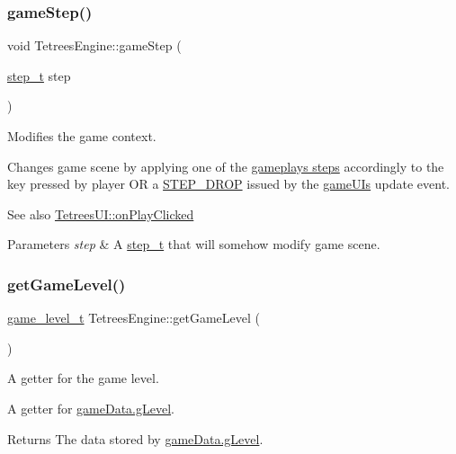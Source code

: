 \subsubsection{\texorpdfstring{game\+Step()}{gameStep()}}
{\footnotesize\ttfamily void Tetrees\+Engine\+::game\+Step (\begin{DoxyParamCaption}\item[{\hyperlink{TetreesDefs_8hpp_a4d5a793092a473f85b4c1f7faf62afed}{step\+\_\+t}}]{step }\end{DoxyParamCaption})}



Modifies the game context. 

Changes game scene by applying one of the \hyperlink{TetreesDefs_8hpp_a4d5a793092a473f85b4c1f7faf62afed}{gameplay\textquotesingle{}s steps} accordingly to the key pressed by player OR a \hyperlink{TetreesDefs_8hpp_a4d5a793092a473f85b4c1f7faf62afed}{S\+T\+E\+P\+\_\+\+D\+R\+OP} issued by the \hyperlink{classTetreesEngine_a01bf1d438236d5f57129ffb22adf59ce}{game\+UI\textquotesingle{}s} update event. \begin{DoxySeeAlso}{See also}
\hyperlink{classTetreesUI_a0aa1932ac8f09f6d8de7ac7d7a2efa94}{Tetrees\+U\+I\+::on\+Play\+Clicked} 
\end{DoxySeeAlso}

\begin{DoxyParams}{Parameters}
{\em step} & A \hyperlink{TetreesDefs_8hpp_a4d5a793092a473f85b4c1f7faf62afed}{step\+\_\+t} that will somehow modify game scene. \\
\hline
\end{DoxyParams}
\mbox{\label{classTetreesEngine_a7ad503b48ba753c446e5438ca67aa4e3}} 
\subsubsection{\texorpdfstring{get\+Game\+Level()}{getGameLevel()}}
{\footnotesize\ttfamily \hyperlink{structgame__level__t}{game\+\_\+level\+\_\+t} Tetrees\+Engine\+::get\+Game\+Level (\begin{DoxyParamCaption}{ }\end{DoxyParamCaption})}



A getter for the game level. 

A getter for \hyperlink{TetreesDefs_8hpp_aebae08b2e3a36f1452b33acaf1eaab40}{game\+Data.g\+Level}. \begin{DoxyReturn}{Returns}
The data stored by \hyperlink{TetreesDefs_8hpp_aebae08b2e3a36f1452b33acaf1eaab40}{game\+Data.g\+Level}. 
\end{DoxyReturn}
\mbox{\label{classTetreesEngine_a46108b9a7ea4ab8ebd27323f9752e208}} 
